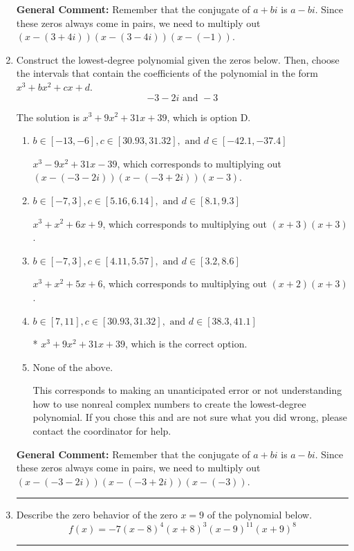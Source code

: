 \documentclass{extbook}[14pt]
\newcommand{\litem}[1]{\item #1

\rule{\textwidth}{0.4pt}}
\begin{document}
\begin{enumerate}
{\textbf{General Comment:} Remember that the conjugate of $a+bi$ is $a-bi$. Since these zeros always come in pairs, we need to multiply out $(x-(3 + 4 i))(x-(3 - 4 i))(x-(-1))$.
}
\litem{
Construct the lowest-degree polynomial given the zeros below. Then, choose the intervals that contain the coefficients of the polynomial in the form $x^3+bx^2+cx+d$.
\[ -3 - 2 i \text{ and } -3 \]

The solution is \( x^{3} +9 x^{2} +31 x + 39 \), which is option D.\begin{enumerate}[label=\Alph*.]
\item \( b \in [-13, -6], c \in [30.93, 31.32], \text{ and } d \in [-42.1, -37.4] \)

$x^{3} -9 x^{2} +31 x -39$, which corresponds to multiplying out $(x-(-3 - 2 i))(x-(-3 + 2 i))(x -3)$.
\item \( b \in [-7, 3], c \in [5.16, 6.14], \text{ and } d \in [8.1, 9.3] \)

$x^{3} + x^{2} +6 x + 9$, which corresponds to multiplying out $(x + 3)(x + 3)$.
\item \( b \in [-7, 3], c \in [4.11, 5.57], \text{ and } d \in [3.2, 8.6] \)

$x^{3} + x^{2} +5 x + 6$, which corresponds to multiplying out $(x + 2)(x + 3)$.
\item \( b \in [7, 11], c \in [30.93, 31.32], \text{ and } d \in [38.3, 41.1] \)

* $x^{3} +9 x^{2} +31 x + 39$, which is the correct option.
\item \( \text{None of the above.} \)

This corresponds to making an unanticipated error or not understanding how to use nonreal complex numbers to create the lowest-degree polynomial. If you chose this and are not sure what you did wrong, please contact the coordinator for help.
\end{enumerate}

\textbf{General Comment:} Remember that the conjugate of $a+bi$ is $a-bi$. Since these zeros always come in pairs, we need to multiply out $(x-(-3 - 2 i))(x-(-3 + 2 i))(x-(-3))$.
}
\litem{
Describe the zero behavior of the zero $x = 9$ of the polynomial below.
\[ f(x) = -7(x - 8)^{4}(x + 8)^{3}(x - 9)^{11}(x + 9)^{8} \]

}
\end{enumerate}
\end{document}
